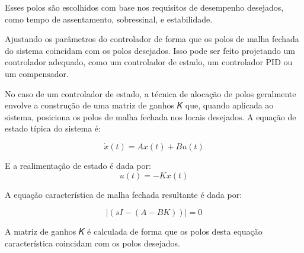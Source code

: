 Esses polos são escolhidos com base nos requisitos de desempenho desejados, como tempo de assentamento, sobressinal, e estabilidade.

Ajustando os parâmetros do controlador de forma que os polos de malha fechada do sistema coincidam com os polos desejados. Isso pode ser feito projetando um controlador adequado, como um controlador de estado, um controlador PID ou um compensador.

No caso de um controlador de estado, a técnica de alocação de polos geralmente envolve a construção de uma matriz de ganhos 𝐾 que, quando aplicada ao sistema, posiciona os polos de malha fechada nos locais desejados.
A equação de estado típica do sistema é:

\begin{equation}
	\dot{x}(𝑡)=𝐴𝑥(𝑡)+𝐵𝑢(𝑡)
\end{equation}

E a realimentação de estado é dada por:
\begin{equation}
	𝑢(𝑡)=−𝐾𝑥(𝑡)
\end{equation}

 A equação característica de malha fechada resultante é dada por:
 
 \begin{equation}
 |(𝑠𝐼−(𝐴−𝐵𝐾))|=0
 \end{equation}
	
A matriz de ganhos 𝐾 é calculada de forma que os polos desta equação característica coincidam com os polos desejados.